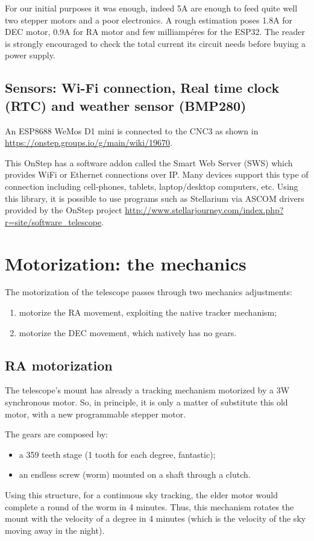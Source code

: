 \documentclass{article}
\begin{document}
\begin{multicols}{2}
        For our initial purposes it was enough, indeed 5A are enough to feed quite well two stepper motors and a poor electronics.
        A rough estimation poses 1.8A for DEC motor, 0.9A for RA motor and few milliampéres for the ESP32. 
        The reader is strongly encouraged to check the total current its circuit needs before buying a power supply.

        \subsection{Sensors: Wi-Fi connection, Real time clock (RTC) and weather sensor (BMP280)}
        An ESP8688 WeMos D1 mini is connected to the CNC3 as shown in \url{https://onstep.groups.io/g/main/wiki/19670}.

        This OnStep has a software addon called the Smart Web Server (SWS) which provides WiFi or Ethernet connections over IP.
        Many devices support this type of connection including cell-phones, tablets, laptop/desktop computers, etc.
        Using this library, it is possible to use programs such as Stellarium via ASCOM drivers provided by the OnStep project \url{http://www.stellarjourney.com/index.php?r=site/software_telescope}.

        \section{Motorization: the mechanics}
        The motorization of the telescope passes through two mechanics adjustments:
        \begin{enumerate}
            \item motorize the RA movement, exploiting the native tracker mechanism;
            \item motorize the DEC movement, which natively has no gears.
        \end{enumerate}

        \subsection{RA motorization}
        The telescope's mount has already a tracking mechanism motorized by a 3W synchronous motor.
        So, in principle, it is only a matter of substitute this old motor, with a new programmable stepper motor.

        The gears are composed by:
        \begin{itemize}
            \item a 359 teeth stage (1 tooth for each degree, fantastic);
            \item an endless screw (worm) mounted on a shaft through a clutch.
        \end{itemize}
        Using this structure, for a continuous sky tracking, the elder motor would complete a round of the worm in 4 minutes.
        Thus, this mechanism rotates the mount with the velocity of a degree in 4 minutes (which is the velocity of the sky moving away in the night).


\end{multicols}
\end{document}
